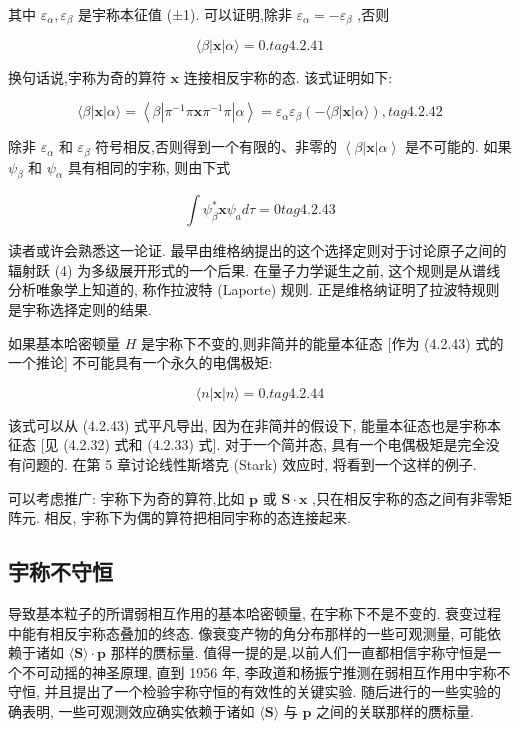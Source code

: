 其中 ${\varepsilon }_{\alpha },{\varepsilon }_{\beta }$ 是宇称本征值 (±1). 可以证明,除非 ${\varepsilon }_{\alpha } = - {\varepsilon }_{\beta }$ ,否则

$$
\langle \beta \left| \mathbf{x}\right| \alpha \rangle = 0. tag{4.2.41}
$$

换句话说,宇称为奇的算符 $\mathbf{x}$ 连接相反宇称的态. 该式证明如下:

$$
\langle \beta \left| \mathbf{x}\right| \alpha \rangle = \left\langle {\beta \left| {{\pi }^{-1}\pi \mathbf{x}{\pi }^{-1}\pi }\right| \alpha }\right\rangle = {\varepsilon }_{\alpha }{\varepsilon }_{\beta }\left( {-\langle \beta \left| \mathbf{x}\right| \alpha \rangle }\right) , tag{4.2.42}
$$

除非 ${\varepsilon }_{\alpha }$ 和 ${\varepsilon }_{\beta }$ 符号相反,否则得到一个有限的、非零的 $\left\langle {\beta \left| \mathbf{x}\right| \alpha }\right\rangle$ 是不可能的. 如果 ${\psi }_{\beta }$ 和 ${\psi }_{\alpha }$ 具有相同的宇称, 则由下式

$$
\int {\psi }_{\beta }^{ * }\mathbf{x}{\psi }_{a}{d\tau } = 0 tag{4.2.43}
$$

读者或许会熟悉这一论证. 最早由维格纳提出的这个选择定则对于讨论原子之间的辐射跃 (4) 为多级展开形式的一个后果. 在量子力学诞生之前, 这个规则是从谱线分析唯象学上知道的, 称作拉波特 (Laporte) 规则. 正是维格纳证明了拉波特规则是宇称选择定则的结果.

如果基本哈密顿量 $H$ 是宇称下不变的,则非简并的能量本征态 [作为 (4.2.43) 式的一个推论] 不可能具有一个永久的电偶极矩:

$$
\langle n\left| \mathbf{x}\right| n\rangle = 0. tag{4.2.44}
$$

该式可以从 (4.2.43) 式平凡导出, 因为在非简并的假设下, 能量本征态也是宇称本征态 [见 (4.2.32) 式和 (4.2.33) 式]. 对于一个简并态, 具有一个电偶极矩是完全没有问题的. 在第 5 章讨论线性斯塔克 (Stark) 效应时, 将看到一个这样的例子.

可以考虑推广: 宇称下为奇的算符,比如 $\mathbf{p}$ 或 $\mathbf{S} \cdot \mathbf{x}$ ,只在相反宇称的态之间有非零矩阵元. 相反, 宇称下为偶的算符把相同宇称的态连接起来.

\subsection{宇称不守恒}

导致基本粒子的所谓弱相互作用的基本哈密顿量, 在宇称下不是不变的. 衰变过程中能有相反宇称态叠加的终态. 像衰变产物的角分布那样的一些可观测量, 可能依赖于诸如 $\langle \mathbf{S}\rangle \cdot \mathbf{p}$ 那样的赝标量. 值得一提的是,以前人们一直都相信宇称守恒是一个不可动摇的神圣原理, 直到 1956 年, 李政道和杨振宁推测在弱相互作用中宇称不守恒, 并且提出了一个检验宇称守恒的有效性的关键实验. 随后进行的一些实验的确表明, 一些可观测效应确实依赖于诸如 $\langle \mathbf{S}\rangle$ 与 $\mathbf{p}$ 之间的关联那样的赝标量.

